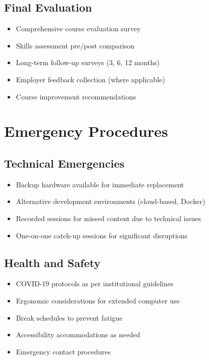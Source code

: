 \documentclass[11pt,a4paper]{article}
\begin{document}
\subsection{Final Evaluation}
\begin{itemize}
    \item Comprehensive course evaluation survey
    \item Skills assessment pre/post comparison
    \item Long-term follow-up surveys (3, 6, 12 months)
    \item Employer feedback collection (where applicable)
    \item Course improvement recommendations
\end{itemize}

\section{Emergency Procedures}

\subsection{Technical Emergencies}
\begin{itemize}
    \item Backup hardware available for immediate replacement
    \item Alternative development environments (cloud-based, Docker)
    \item Recorded sessions for missed content due to technical issues
    \item One-on-one catch-up sessions for significant disruptions
\end{itemize}

\subsection{Health and Safety}
\begin{itemize}
    \item COVID-19 protocols as per institutional guidelines
    \item Ergonomic considerations for extended computer use
    \item Break schedules to prevent fatigue
    \item Accessibility accommodations as needed
    \item Emergency contact procedures
\end{itemize}
\end{document}
